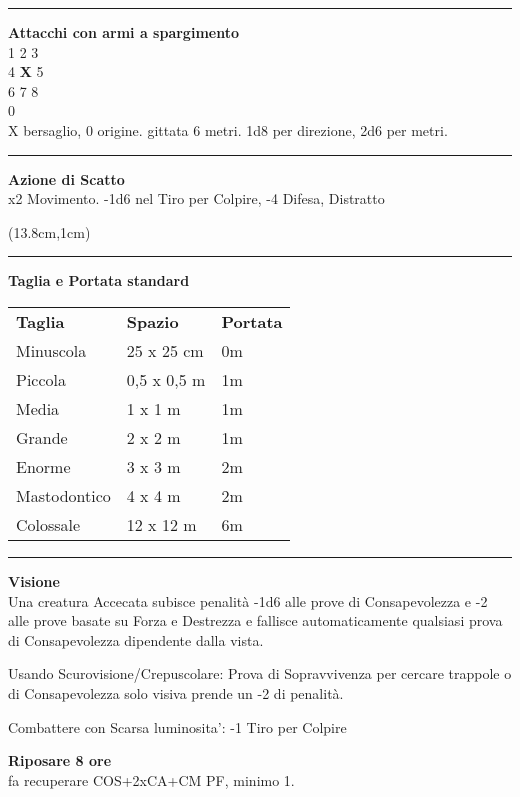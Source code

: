 \documentclass[a4paper,12 pt,openany]{book}
\newcommand{\riga}{\rule{\textwidth}{0.4pt}}
\begin{document}
\begin{textblock*}{8.3cm}
\riga

\textbf{Attacchi con armi a spargimento}\\
1 2 3\\
4 \textbf{X} 5\\
6 7 8\\
0\\
X bersaglio, 0 origine. gittata 6 metri. 1d8 per direzione, 2d6 per metri.

\riga

\textbf{Azione di Scatto}\\
x2 Movimento. -1d6 nel Tiro per Colpire, -4 Difesa, Distratto



\end{textblock*}

\begin{textblock*}{6.2cm}(13.8cm,1cm) %

\riga

\textbf{Taglia e Portata standard}\\
\begin{tabular}{lll}
	\textbf{Taglia}& \textbf{Spazio} &\textbf{Portata}\\
	Minuscola & 25 x 25 cm&0m\\
	Piccola & 0,5 x 0,5 m &1m\\
	Media & 1 x 1 m & 1m\\
	Grande & 2 x 2 m& 1m\\
	Enorme & 3 x 3 m &2m\\
	Mastodontico & 4 x 4 m&2m\\
	Colossale & 12 x 12 m&6m\\	
\end{tabular}

\riga

\textbf{Visione}\\

Una creatura Accecata subisce penalità -1d6 alle prove di Consapevolezza e -2 alle prove basate su Forza e Destrezza e fallisce automaticamente qualsiasi prova di Consapevolezza dipendente dalla vista.

Usando Scurovisione/Crepuscolare: Prova di Sopravvivenza per cercare trappole o di Consapevolezza solo visiva prende un -2 di penalità.

Combattere con Scarsa luminosita': -1 Tiro per Colpire


\textbf{Riposare 8 ore} \\fa recuperare COS+2xCA+CM PF, minimo 1.


\end{textblock*}
\end{document}
